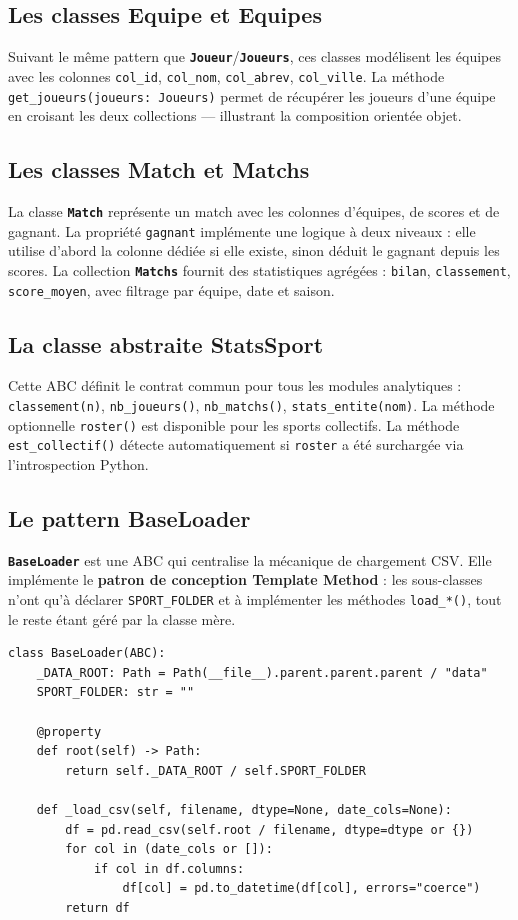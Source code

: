 \documentclass[12pt,a4paper]{article}
\newcommand{\code}[1]{\texttt{#1}}
\newcommand{\classe}[1]{\texttt{\textbf{#1}}}
\begin{document}
\subsection{Les classes Equipe et Equipes}

Suivant le même pattern que \classe{Joueur}/\classe{Joueurs}, ces classes modélisent
les équipes avec les colonnes \code{col\_id}, \code{col\_nom}, \code{col\_abrev},
\code{col\_ville}. La méthode \code{get\_joueurs(joueurs: Joueurs)} permet de récupérer
les joueurs d'une équipe en croisant les deux collections --- illustrant la composition
orientée objet.

\subsection{Les classes Match et Matchs}

La classe \classe{Match} représente un match avec les colonnes d'équipes, de scores et
de gagnant. La propriété \code{gagnant} implémente une logique à deux niveaux : elle
utilise d'abord la colonne dédiée si elle existe, sinon déduit le gagnant depuis les scores.
La collection \classe{Matchs} fournit des statistiques agrégées : \code{bilan},
\code{classement}, \code{score\_moyen}, avec filtrage par équipe, date et saison.

\subsection{La classe abstraite StatsSport}

Cette ABC définit le contrat commun pour tous les modules analytiques :
\code{classement(n)}, \code{nb\_joueurs()}, \code{nb\_matchs()},
\code{stats\_entite(nom)}. La méthode optionnelle \code{roster()} est disponible pour
les sports collectifs. La méthode \code{est\_collectif()} détecte automatiquement si
\code{roster} a été surchargée via l'introspection Python.

\subsection{Le pattern BaseLoader}

\classe{BaseLoader} est une ABC qui centralise la mécanique de chargement CSV.
Elle implémente le \textbf{patron de conception Template Method} : les sous-classes n'ont
qu'à déclarer \code{SPORT\_FOLDER} et à implémenter les méthodes \code{load\_*()},
tout le reste étant géré par la classe mère.

\begin{lstlisting}[caption={BaseLoader.py -- infrastructure commune à tous les loaders}]
class BaseLoader(ABC):
    _DATA_ROOT: Path = Path(__file__).parent.parent.parent / "data"
    SPORT_FOLDER: str = ""

    @property
    def root(self) -> Path:
        return self._DATA_ROOT / self.SPORT_FOLDER

    def _load_csv(self, filename, dtype=None, date_cols=None):
        df = pd.read_csv(self.root / filename, dtype=dtype or {})
        for col in (date_cols or []):
            if col in df.columns:
                df[col] = pd.to_datetime(df[col], errors="coerce")
        return df
\end{lstlisting}
\end{document}

